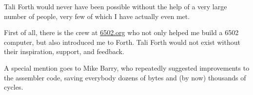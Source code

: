 Tali Forth would never have been possible without the help of a very large
number of people, very few of which I have actually even met.

First of all, there is the crew at
\href{http://6502.org}{6502.org} who not only helped me build a
6502 computer, but also introduced me to Forth. Tali Forth would not exist
without their inspiration, support, and feedback.

A special mention goes to Mike Barry, who repeatedly
suggested improvements to the assembler code, saving everybody dozens of bytes
and (by now) thousands of cycles.

